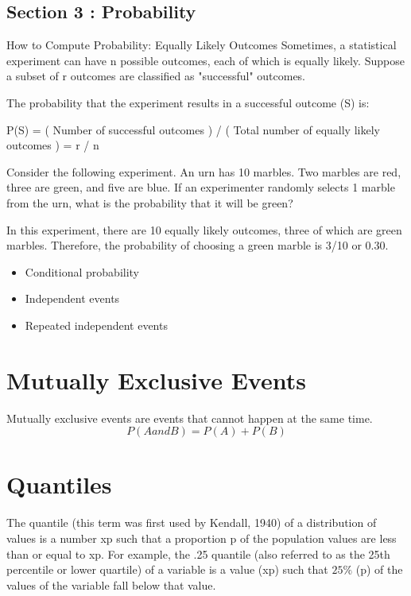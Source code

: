 \subsection*{Section 3 : Probability}

How to Compute Probability: Equally Likely Outcomes
Sometimes, a statistical experiment can have n possible outcomes, each of which is equally likely. Suppose a subset of r outcomes are classified as "successful" outcomes.

The probability that the experiment results in a successful outcome (S) is:

P(S) = ( Number of successful outcomes ) / ( Total number of equally likely outcomes ) = r / n

Consider the following experiment. An urn has 10 marbles. Two marbles are red, three are green, and five are blue. If an experimenter randomly selects 1 marble from the urn, what is the probability that it will be green?

In this experiment, there are 10 equally likely outcomes, three of which are green marbles. Therefore, the probability of choosing a green marble is 3/10 or 0.30.

\begin{itemize}
\item Conditional probability
\item Independent events
\item Repeated independent events
\end{itemize}


\section{Mutually Exclusive Events}
Mutually exclusive events are events that cannot happen at the same time.
\[ P(A and B) = P(A) + P(B) \]

\section{Quantiles}

The quantile (this term was first used by Kendall, 1940) of a distribution of values is a number xp such that a proportion p of the population values are less than or equal to xp. For example, the .25 quantile (also referred to as the 25th percentile or lower quartile) of a variable is a value (xp) such that $25\%$ (p) of the values of the variable fall below that value.

